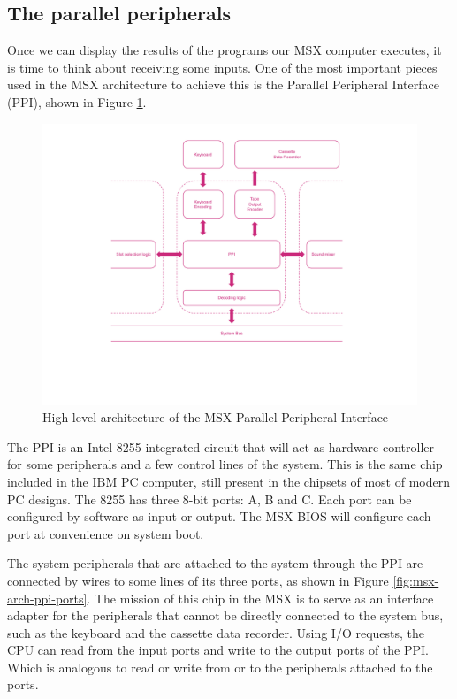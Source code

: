 \subsection{The parallel peripherals}

Once we can display the results of the programs our MSX computer executes, it is time to think about receiving some inputs. One of the most important pieces used in the MSX architecture to achieve this is the Parallel Peripheral Interface (PPI), shown in Figure \ref{fig:msx-arch-ppi}.

\begin{figure}
	\centering
	\includegraphics[width=1\linewidth,trim={0cm 100 0 100}]{images/figures/msx-arch-ppi}
	\caption{High level architecture of the MSX Parallel Peripheral Interface}
	\label{fig:msx-arch-ppi}
\end{figure}

The PPI is an Intel 8255 integrated circuit that will act as hardware controller for some peripherals and a few control lines of the system. This is the same chip included in the IBM PC computer, still present in the chipsets of most of modern PC designs. The 8255 has three 8-bit ports: A, B and C. Each port can be configured by software as input or output. The MSX BIOS will configure each port at convenience on system boot. 

The system peripherals that are attached to the system through the PPI are connected by wires to some lines of its three ports, as shown in Figure \ref{fig:msx-arch-ppi-ports}. The mission of this chip in the MSX is to serve as an interface adapter for the peripherals that cannot be directly connected to the system bus, such as the keyboard and the cassette data recorder. Using I/O requests, the CPU can read from the input ports and write to the output ports of the PPI. Which is analogous to read or write from or to the peripherals attached to the ports.

